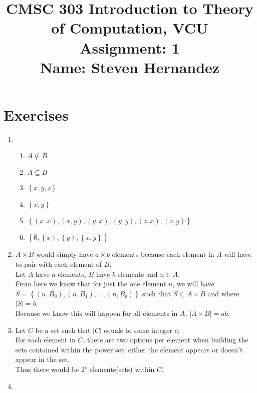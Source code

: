 \documentclass{article}
\newcommand{\set}[1]{{\left\{#1\right\}}}    %
\newcommand{\abs}[1]{\left\lvert #1 \right\rvert}
\begin{document}
\title{
    CMSC 303 Introduction to Theory of Computation, VCU\\
    Assignment: 1\\
    Name: Steven Hernandez
}

\date{}

\maketitle
\vspace{-10mm}

\section{Exercises}
\begin{enumerate}
    \item %
        \begin{enumerate}
            \item $A \not\subseteq B$
            \item $A \subseteq B$
            \item $\set{x,y,z}$
            \item $\set{x,y}$
            \item $\set{(x,x),(x,y),(y,x),(y,y),(z,x),(z,y)}$
            \item $\set{\emptyset,\set{x},\set{y},\set{x,y}}$
        \end{enumerate}
    \item %
        $A \times B$ would simply have $a \times b$ elements because each element in $A$ will have to pair with each element of $B$. \\
        Let $A$ have $a$ elements, $B$ have $b$ elements and $n \in A$. \\
        From here we know that for just the one element $n$, we will have $S =\set{(n,B_0), (n,B_1),\ldots,(n,B_b)}$ such that $S \subseteq A \times B$ and where $\abs{S} = b$. \\
        Because we know this will happen for all elements in $A$, $\abs{A \times B} = ab$.
    \item %
        Let $C$ be a set such that $\abs{C}$ equals to some integer $c$. \\
        For each element in $C$, there are two options per element when building the sets contained within the power set; either the element appears or doesn't appear in the set. \\
        Thus there would be $2^c$ elements(sets) within $C$.
    \item %

\end{enumerate}
\end{document}
